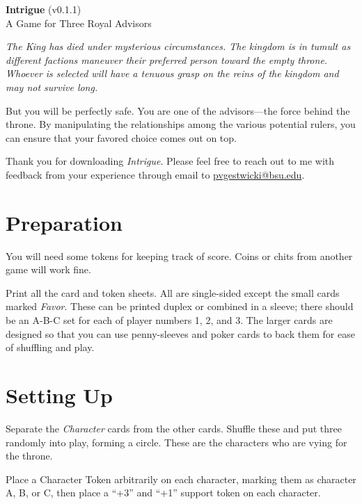 \documentclass{article}
\begin{document}
\begin{centering}
  \Large{\textbf {Intrigue}} (v0.1.1)\\
  A Game for Three Royal Advisors\\
\end{centering}

\vspace{0.5cm}

{\itshape The King has died under mysterious circumstances. The
  kingdom is in tumult as different factions maneuver their preferred
  person toward the empty throne.  Whoever is selected will have a
  tenuous grasp on the reins of the kingdom and may not survive long.

  But you will be perfectly safe. You are one of the advisors---the force
  behind the throne. By manipulating the relationships among the
  various potential rulers, you can ensure that your favored
  choice comes out on top.
}

\vspace{0.5cm}

Thank you for downloading \textit{Intrigue}. Please feel free to reach
out to me with feedback from your experience through email to
\url{pvgestwicki@bsu.edu}. 


\section*{Preparation}

You will need some tokens for keeping track of score. Coins or chits from
another game will work fine.

Print all the card and token sheets. All are single-sided except
the small cards marked \textit{Favor}. These can be printed duplex or
combined in a sleeve; there should be an A-B-C set for each of player
numbers 1, 2, and 3. The larger cards are designed so that you can
use penny-sleeves and poker cards to back them for ease of shuffling
and play.


\section*{Setting Up}

Separate the \textit{Character} cards from the other cards.
Shuffle these and put three randomly into play, forming a circle.
These are the characters who are vying for the throne.

Place a Character Token arbitrarily on each character, marking them
as character A, B, or C, then place a ``+3'' and ``+1'' support
token on each character.
\end{document}
